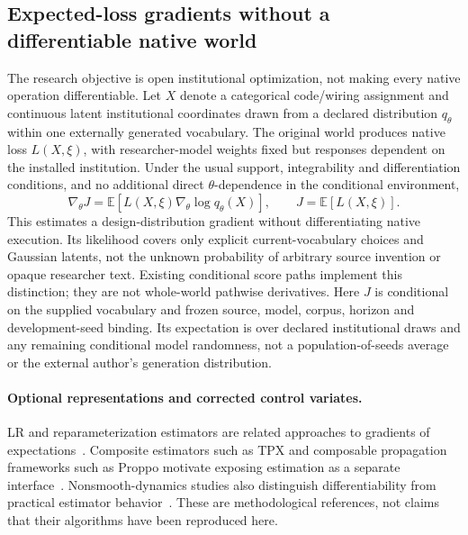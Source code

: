 \subsection{Expected-loss gradients without a differentiable native world}
\label{sec:native-estimators-v11}

The research objective is open institutional optimization, not making every
native operation differentiable. Let $X$ denote a categorical code/wiring
assignment and continuous latent institutional coordinates drawn from a
declared distribution $q_\theta$ within one externally generated vocabulary.
The original world produces native loss $L(X,\xi)$, with researcher-model
weights fixed but responses dependent on the installed institution. Under the
usual support, integrability and differentiation conditions, and no additional
direct $\theta$-dependence in the conditional environment,
\begin{equation}
 \nabla_\theta J
 = \mathbb E\!\left[L(X,\xi)\nabla_\theta\log q_\theta(X)\right],
 \qquad J=\mathbb E[L(X,\xi)].
 \label{eq:native-v11-score}
\end{equation}
This estimates a design-distribution gradient without differentiating native
execution. Its likelihood covers only explicit current-vocabulary choices and
Gaussian latents, not the unknown probability of arbitrary source invention
or opaque researcher text. Existing conditional score paths implement this
distinction; they are not whole-world pathwise derivatives.
Here $J$ is conditional on the supplied vocabulary and frozen source, model,
corpus, horizon and development-seed binding. Its expectation is over declared
institutional draws and any remaining conditional model randomness, not a
population-of-seeds average or the external author's generation distribution.

\paragraph{Optional representations and corrected control variates.}
LR and reparameterization estimators are related approaches to gradients of
expectations~\citep{parmas2021unified}. Composite estimators such as TPX and
composable propagation frameworks such as Proppo motivate exposing estimation
as a separate interface~\citep{parmas2023composite,parmas2022proppo}.
Nonsmooth-dynamics studies also distinguish differentiability from practical
estimator behavior~\citep{onoda2026differentiable}. These are methodological
references, not claims that their algorithms have been reproduced here.

